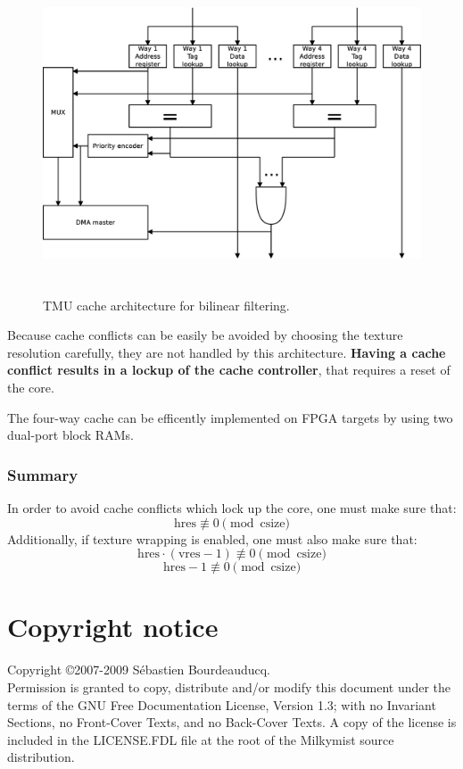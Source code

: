 \documentclass[a4paper,11pt]{article}
\begin{document}
\begin{figure}[H]
\centering
\includegraphics[height=95mm]{carch.eps}
\caption{TMU cache architecture for bilinear filtering.}\label{fig:carch}
\end{figure}

Because cache conflicts can be easily be avoided by choosing the texture resolution carefully, they are not handled by this architecture. \textbf{Having a cache conflict results in a lockup of the cache controller}, that requires a reset of the core.

The four-way cache can be efficently implemented on FPGA targets by using two dual-port block RAMs.

\subsubsection{Summary}
In order to avoid cache conflicts which lock up the core, one must make sure that:
\begin{equation*}
\text{hres} \not \equiv 0 \pmod{\text{csize}}
\end{equation*}
Additionally, if texture wrapping is enabled, one must also make sure that:
\begin{equation*}
\text{hres}\cdot(\text{vres}-1) \not \equiv 0 \pmod{\text{csize}}
\end{equation*}
\begin{equation*}
\text{hres}-1 \not \equiv 0 \pmod{\text{csize}}
\end{equation*}

\section*{Copyright notice}
Copyright \copyright 2007-2009 S\'ebastien Bourdeauducq. \\
Permission is granted to copy, distribute and/or modify this document under the terms of the GNU Free Documentation License, Version 1.3; with no Invariant Sections, no Front-Cover Texts, and no Back-Cover Texts. A copy of the license is included in the LICENSE.FDL file at the root of the Milkymist source distribution.
\end{document}
